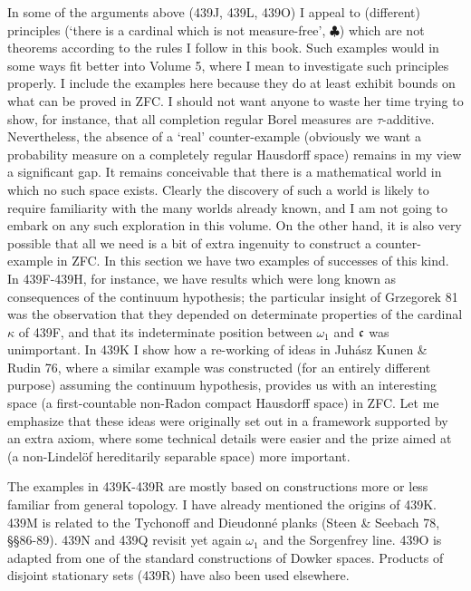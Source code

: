 {%
In some of the arguments above (439J, 439L, 439O) I appeal to
(different) principles (`there is a cardinal which is not measure-free',
$\clubsuit$) which are not
theorems according to the rules I follow in this book.   Such examples
would in some ways fit better into Volume 5, where I mean to investigate
such principles properly.   I include the examples here because they do
at least exhibit bounds on what can be proved in ZFC.   I should not
want anyone to waste her time trying to show, for instance, that all
completion regular Borel measures are $\tau$-additive.   Nevertheless,
the absence of a `real' counter-example (obviously we want a probability
measure on a completely regular Hausdorff space) remains in my view a
significant gap.   It remains conceivable that there is a mathematical
world in which no such space exists.   Clearly the discovery of such a
world is likely to require familiarity with the many worlds already
known, and I am not going to embark on any such exploration in this
volume.   On the other hand, it is also very possible that all we need
is a bit of extra ingenuity to construct a counter-example in ZFC.   In
this section we have two examples of successes of this kind.   In
439F-439H, for instance, we have results which were long known as
consequences of the continuum hypothesis;  the particular insight of
{\smc Grzegorek 81} was the observation that they depended on
determinate properties of the cardinal $\kappa$ of 439F, and that its
indeterminate position between $\omega_1$ and $\frak c$ was unimportant.
In 439K I show how a
re-working of ideas in {\smc Juh\'asz Kunen \& Rudin 76}, where a
similar example was constructed (for an entirely different purpose)
assuming the continuum hypothesis, provides us with an interesting space
(a first-countable non-Radon compact Hausdorff space) in ZFC.   Let me
emphasize that these ideas were originally set out in a framework
supported by an extra axiom, where some technical details were easier
and the prize aimed at (a non-Lindel\"of hereditarily separable space)
more important.

The examples in 439K-439R are mostly based on constructions more or less
familiar from general topology.   I have already mentioned the origins
of 439K.   439M is related to the Tychonoff and Dieudonn\'e planks
({\smc Steen \& Seebach 78}, \S\S86-89).   439N and 439Q revisit yet
again $\omega_1$ and the Sorgenfrey line.   439O is adapted from one of
the standard constructions of Dowker spaces.   Products of disjoint
stationary sets (439R) have also been used elsewhere.
}%

\frnewpage

